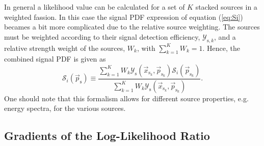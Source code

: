 \documentclass{article}
\newcommand{\ps}{\vec{p}_{\mathrm{s}}}
\newcommand{\psk}{\vec{p}_{\mathrm{s}_k}}
\newcommand{\xsk}{\vec{x}_{\mathrm{s}_k}}
\begin{document}
In general a likelihood value can be calculated for a set of $K$ stacked
sources in a weighted fassion. In this case the signal PDF expression of
equation (\ref{eq:Si}) becames a bit more complicated due to the relative
source weighting. The sources must be weighted according to their signal detection
efficiency, $\mathcal{Y}_{\mathrm{s},k}$, and a relative strength weight of the
sources, $W_k$, with $\sum_{k=1}^{K} W_k = 1$. Hence, the combined signal PDF is
given as
\begin{equation}
 \mathcal{S}_i(\ps) \equiv \frac{\sum_{k=1}^{K} W_k \mathcal{Y}_{\mathrm{s}}(\xsk,\psk) \mathcal{S}_{i}(\psk)}{\sum_{k=1}^{K}W_k\mathcal{Y}_{\mathrm{s}}(\xsk,\psk)}.
 \label{eq:SiStacking}
\end{equation}
One should note that this formalism allows for different source properties, e.g.
energy spectra, for the various sources.


\subsection{Gradients of the Log-Likelihood Ratio}
\end{document}
